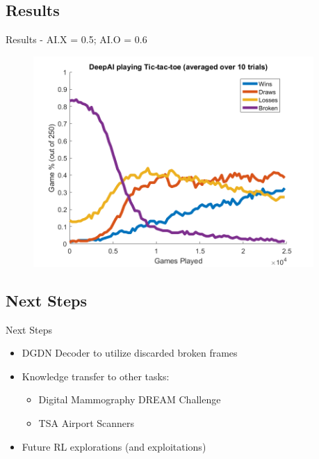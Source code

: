 \documentclass[11pt]{beamer}
\begin{document}
\subsection{Results}
\begin{frame}{Results - AI.X = 0.5; AI.O = 0.6}
	\begin{figure}[Results]
		\centering
		\includegraphics[width=0.95\textwidth]{Figures/results05X06O.png}
	\end{figure}
\end{frame}

\subsection{Next Steps}
\begin{frame}{Next Steps}
	\begin{itemize}
		\item DGDN Decoder to utilize discarded broken frames
		\item Knowledge transfer to other tasks: 
		\begin{itemize}
			\item Digital Mammography DREAM Challenge
			\item TSA Airport Scanners
		\end{itemize}
		\item Future RL explorations (and exploitations)
	\end{itemize}
\end{frame}
\end{document}
